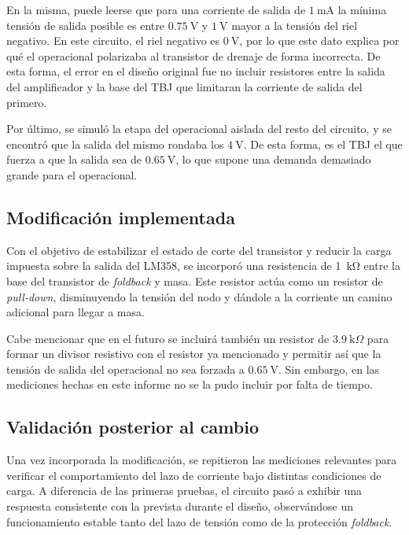 \documentclass[a4paper,12pt]{article}
\begin{document}
En la misma, puede leerse que para una corriente de salida de $\SI{1}{\milli \ampere}$ la mínima tensión de salida posible es entre $\SI{0.75}{\volt}$ y $\SI{1}{\volt}$ mayor a la tensión del riel negativo. En este circuito, el riel negativo es $\SI{0}{\volt}$, por lo que este dato explica por qué el operacional polarizaba al transistor de drenaje de forma incorrecta. De esta forma, el error en el diseño original fue no incluir resistores entre la salida del amplificador y la base del TBJ que limitaran la corriente de salida del primero.


Por último, se simuló la etapa del operacional aislada del resto del circuito, y se encontró que la salida del mismo rondaba los $\SI{4}{\volt}$. De esta forma, es el TBJ el que fuerza a que la salida sea de $\SI{0.65}{\volt}$, lo que supone una demanda demasiado grande para el operacional.

\subsection{Modificación implementada}

Con el objetivo de estabilizar el estado de corte del transistor y reducir la carga impuesta sobre la salida del LM358, se incorporó una resistencia de \SI{1}{\kilo\ohm} entre la base del transistor de \textit{foldback} y masa. Este resistor actúa como un resistor de \textit{pull-down}, disminuyendo la tensión del nodo y dándole a la corriente un camino adicional para llegar a masa. 

Cabe mencionar que en el futuro se incluirá también un resistor de $\SI{3.9}{\kilo \Omega}$ para formar un divisor resistivo con el resistor ya mencionado y permitir así que la tensión de salida del operacional no sea forzada a $\SI{0.65}{\volt}$. Sin embargo, en las mediciones hechas en este informe no se la pudo incluir por falta de tiempo. 

\subsection{Validación posterior al cambio}
Una vez incorporada la modificación, se repitieron las mediciones relevantes para verificar el comportamiento del lazo de corriente bajo distintas condiciones de carga. A diferencia de las primeras pruebas, el circuito pasó a exhibir una respuesta consistente con la prevista durante el diseño, observándose un funcionamiento estable tanto del lazo de tensión como de la protección \textit{foldback}.
\end{document}
